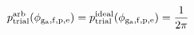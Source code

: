 \documentclass[12pt]{article}
\begin{document}
\begin{displaymath}
p_{\rm trial}^{\rm arb}(\phi_{\rm g_a,f,p,e}) =
p_{\rm trial}^{\rm ideal}(\phi_{\rm g_a,f,p,e}) = {{1}\over{2 \pi}}
\end{displaymath}
\end{document}
